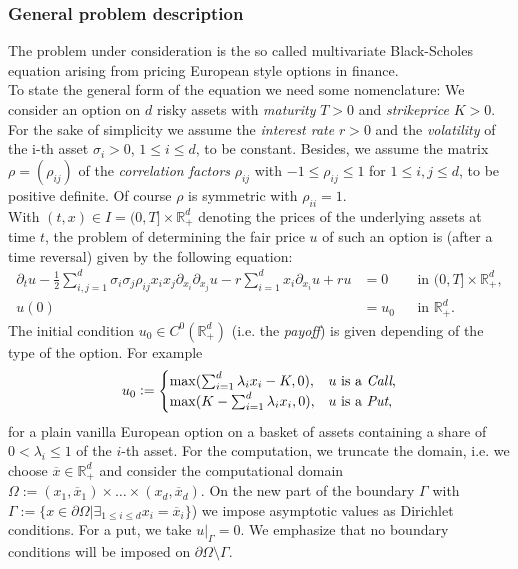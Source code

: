 \subsubsection{General problem description}

The problem under consideration is the so called multivariate Black-Scholes equation arising from pricing European style options in finance.  \\
To state the general form of the equation we need some nomenclature: We consider an option on $d$ risky assets with \textit{maturity} $T>0$ and \textit{strikeprice} $K>0$. For the sake of simplicity we assume the \textit{interest rate} $r>0$ and the \textit{volatility} of the i-th asset $\sigma_i>0$, $1\leq i\leq d$, to be constant. Besides, we assume the matrix $\rho=(\rho_{ij})$ of the \textit{correlation factors} $\rho_{ij}$ with  $-1\leq \rho_{ij}\leq 1$ for  $1\leq i,j \leq d$, to be positive definite. Of course $\rho$ is symmetric with $\rho_{ii}=1$.\\ 
With $(t,x) \in I=(0,T] \times \mathbb{R}^d_+$ denoting the prices of the underlying assets at time $t$, the problem of determining the fair price $u$ of such an option is (after a time reversal) given by the following equation:
\begin{subequations}
\begin{align} 
   \partial_t{u}-\frac12\sum_{i,j=1}^d \sigma_i\sigma_j\rho_{ij}x_ix_j \partial_{{x_i}}\partial_{x_j}u-r\sum_{i=1}^dx_i\partial_{x_i}{u}+ru&=0 &&\mbox{in } (0,T]\times \mathbb{R}_+^d,\\
   u(0)&=u_0 &&\mbox{in } \mathbb{R}_+^d.
\end{align}
\end{subequations}
The initial condition $u_0\in C^{0}\left({\mathbb{R}_+^d}\right) $ (i.e. the \textit{payoff}) is given depending of the type of the option. For example
\begin{equation}
u_0 :=\begin{cases} 
\max(\sum_{i=1}^d \lambda_i x_i-K,0),&  u\text{ is a \textit{Call},}\\
\max(K-\sum_{i=1}^d\lambda_i x_i,0),& u\text{ is a \textit{Put},}
\end{cases}
\end{equation}  
for a plain vanilla European option on a basket of assets containing a share of $0<\lambda_i\leq 1$ of the $i$-th asset. For the computation, we truncate the domain, i.e. we choose $\overline x \in \mathbb{R}^d_+$ and consider the computational domain $\Omega := (x_1, \overline x_1)\times \dots \times (x_d, \overline x_d)$. On the new part of the boundary $\Gamma$ with $\Gamma :=\{x\in \partial\Omega |\exists_{1\leq i\leq d}  x_i=\overline x_i\}$) we impose asymptotic values as Dirichlet conditions. For a put, we take $u|_\Gamma=0$. We emphasize that no boundary conditions will be imposed on $\partial \Omega \setminus \Gamma$.\\
